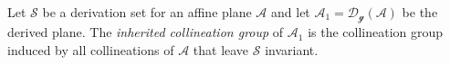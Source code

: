 Let $\mathcal{S}$ be a derivation set for an affine plane $\mathcal{A}$ and let $\mathcal{A}_1 = \mathcal{D}_{\mathcal{g}}(\mathcal{A})$ be the derived plane. The \textit{inherited collineation group} of $\mathcal{A}_1$ is the collineation group induced by all collineations of $\mathcal{A}$ that leave $\mathcal{S}$ invariant.
